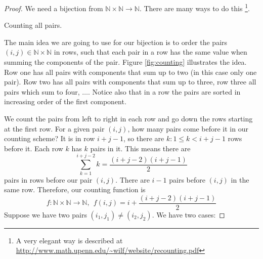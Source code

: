 \begin{proof}
We need a bijection from $\mathbb{N} \times \mathbb{N} \rightarrow \mathbb{N}$. There are many ways to do this 
\footnote{A very elegant way is described at \url{http://www.math.upenn.edu/~wilf/website/recounting.pdf}}.

\begin{marginfigure}[1.0in]
\caption{Counting all pairs.}
\label{fig:counting}
\end{marginfigure}

The main idea we are going to use for our bijection is to order the pairs $(i, j) \in \mathbb{N} \times \mathbb{N}$ in rows, such that each pair in a row has the same value when summing the components of the pair. Figure \ref{fig:counting} illustrates the idea. Row one has all pairs with components that sum up to two (in this case only one pair). Row two has all pairs with components that sum up to three, row three all pairs which sum to four, $\dots$. Notice also that
in a row the pairs are sorted in increasing order of the first component.

We count the pairs from left to right in each row and go down the rows starting at the first row. For a given pair $(i, j)$, how many pairs come before it in our counting scheme? It is in row $i + j - 1$, so there are $k: 1 \le k < i + j - 1$ rows before it.  Each row $k$ has $k$ pairs in it. This means there are
$$
\sum_{k=1}^{i+j-2} k = \frac{(i+j-2)(i+j-1)}{2}
$$
pairs in rows before our pair $(i, j)$. There are $i - 1$ pairs before $(i, j)$ in the same row. Therefore, our counting function is 
$$
f:\mathbb{N} \times \mathbb{N} \rightarrow \mathbb{N}, ~~f(i, j) = i + \frac{(i+j-2)(i+j-1)}{2}
$$
Suppose we have two pairs $(i_1, j_1) \ne (i_2, j_2)$. We have two cases:


\end{proof}
